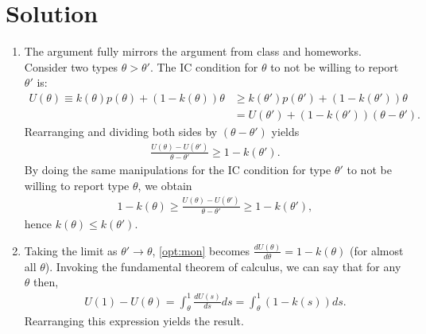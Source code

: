 \documentclass[a4paper]{article}
\newif\ifsolutions
\begin{document}
\ifsolutions
\section*{Solution}
\begin{enumerate}
	\item The argument fully mirrors the argument from class and homeworks. Consider two types $\theta > \theta'$. The IC condition for $\theta$ to not be willing to report $\theta'$ is:
	\begin{align*}
		U(\theta) \equiv k(\theta) p(\theta) + (1-k(\theta)) \theta &\geq k(\theta') p(\theta') + (1-k(\theta')) \theta
		\\
		&= U(\theta') + (1-k(\theta')) (\theta-\theta').
	\end{align*}
	Rearranging and dividing both sides by $(\theta-\theta')$ yields
	\begin{align*}
		\frac{U(\theta)-U(\theta')}{\theta-\theta'} \geq 1-k(\theta').
	\end{align*}
	By doing the same manipulations for the IC condition for type $\theta'$ to not be willing to report type $\theta$, we obtain
	\begin{align}
		\label{opt:mon}
		1-k(\theta) \geq \frac{U(\theta)-U(\theta')}{\theta-\theta'} \geq 1-k(\theta'),
	\end{align}
	hence $k(\theta) \leq k(\theta')$.
	
	\item Taking the limit as $\theta' \to \theta$, \eqref{opt:mon} becomes $\frac{dU(\theta)}{d\theta} = 1-k(\theta)$ (for almost all $\theta$). Invoking the fundamental theorem of calculus, we can say that for any $\theta$ then,
	\begin{align}
		\label{opt:ERP}
		U(1) - U(\theta) = \int_{\theta}^{1} \frac{dU(s)}{ds} ds = \int_{\theta}^{1} (1-k(s)) ds.
	\end{align}
	Rearranging this expression yields the result.
	

\end{enumerate}
\end{document}

